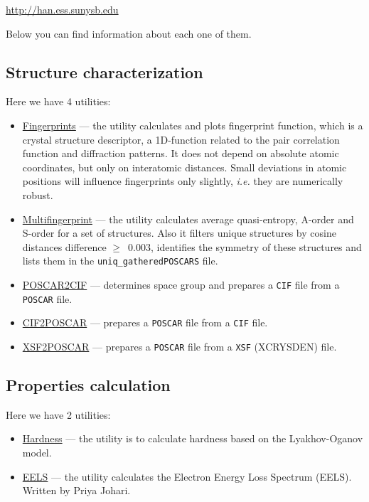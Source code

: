 \documentclass[12pt]{article}
\newcommand{\file}[1]{\texttt{#1}}
\begin{document}
\begin{center}
\textcolor{blue}{\url{http://han.ess.sunysb.edu}}
\end{center}

Below you can find information about each one of them.

\subsection{Structure characterization}
Here we have 4 utilities:
\begin{itemize}

\item \textcolor{blue}{\href{http://han.ess.sunysb.edu/fingerprints}{Fingerprints}}
--- the utility calculates and plots fingerprint function, which is a crystal
structure descriptor, a 1D-function related to the pair correlation function
and diffraction patterns. It does not depend on absolute atomic coordinates, but
only on interatomic distances. Small deviations in atomic positions will
influence fingerprints only slightly, \emph{i.e.} they are numerically robust.

\item \textcolor{blue}{\href{http://han.ess.sunysb.edu/multifingerprint}{Multifingerprint}}
--- the utility calculates average quasi-entropy, A-order and S-order for a set
of structures. Also it filters unique structures by cosine distances difference
$\geq$~0.003, identifies the symmetry of these structures and lists them in the
\file{uniq\_gatheredPOSCARS} file.

\item \textcolor{blue}{\href{http://han.ess.sunysb.edu/poscar2cif}{POSCAR2CIF}}
--- determines space group and prepares a \file{CIF} file from a \file{POSCAR}
file.

\item \textcolor{blue}{\href{http://han.ess.sunysb.edu/cif2poscar}{CIF2POSCAR}}
--- prepares a \file{POSCAR} file from a \file{CIF} file.

\item \textcolor{blue}{\href{http://han.ess.sunysb.edu/xsf2poscar}{XSF2POSCAR}}
--- prepares a \file{POSCAR} file from a \file{XSF} (XCRYSDEN) file.

\end{itemize}

\subsection{Properties calculation}
Here we have 2 utilities:
\begin{itemize}

\item \textcolor{blue}{\href{http://han.ess.sunysb.edu/hardness}{Hardness}}
--- the utility is to calculate hardness based on the Lyakhov-Oganov model.

\item \textcolor{blue}{\href{http://han.ess.sunysb.edu/EELS}{EELS}}
--- the utility calculates the Electron Energy Loss Spectrum (EELS). Written by
Priya Johari.

\end{itemize}
\end{document}
